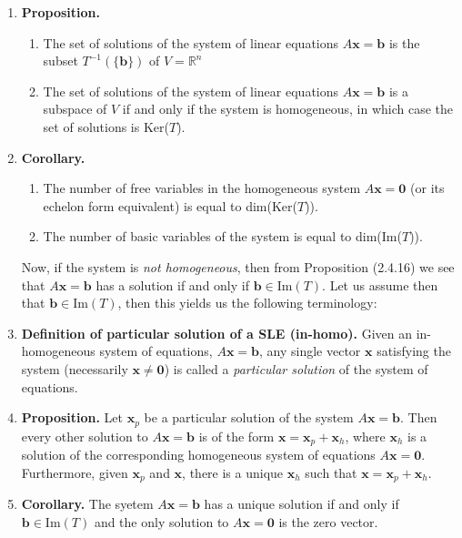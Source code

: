 \documentclass[oneside, 12pt]{book}
\newcommand{\settag}[1]{\renewcommand{\theenumi}{#1}}
\newcommand{\R}{\mathbb{R}}
\newcommand{\tbf}[1]{\textbf{#1}}
\newcommand{\tit}[1]{\textit{#1}}
\newcommand{\para}[1]{\item \tbf{#1}}
\newcommand{\vb}{\mathbf{b}}
\newcommand{\vx}{\mathbf{x}}
\begin{document}
\begin{enumerate}
        \settag{2.4.16}
        \para{Proposition.}
        \begin{enumerate}
            \item The set of solutions of the system of linear equations $A\vx = \vb$ is the subset $T^{-1}\left(\{\vb\}\right)$ of $V = \R^n$
            \item The set of solutions of the system of linear equations $A\vx = \vb$ is a subspace of $V$ if and only if the system is homogeneous, in which case the set of solutions is Ker($T$).
        \end{enumerate}
        
        \settag{2.4.17}
        \para{Corollary.} 
        \begin{enumerate}
            \item The number of free variables in the homogeneous system $A\vx = \mathbf{0}$ (or its echelon form equivalent) is equal to dim(Ker($T$)).
            \item The number of basic variables of the system is equal to dim(Im($T$)).
        \end{enumerate}
        Now, if the system is \tit{not homogeneous}, then from Proposition (2.4.16) we see that $A\vx = \vb$ has a solution if and only if $\vb \in \text{Im}(T)$. Let us assume then that $\vb \in \text{Im}(T)$, then this yields us the following terminology:
        
        \settag{2.4.18}
        \para{Definition of particular solution of a SLE (in-homo).} Given an in-homogeneous system of equations, $A\vx = \vb$, any single vector $\vx$ satisfying the system (necessarily $\vx \neq \mathbf{0}$) is called a \tit{particular solution} of the system of equations.
        
        \settag{2.4.19}
        \para{Proposition.} Let $\vx_p$ be a particular solution of the system $A\vx = \vb$. Then every other solution to $A\vx = \vb$ is of the form $\vx = \vx_p + \vx_h$, where $\vx_h$ is a solution of the corresponding homogeneous system of equations $A\vx = \mathbf{0}$. Furthermore, given $\vx_p$ and $\vx$, there is a unique $\vx_h$ such that $\vx = \vx_p + \vx_h$.
        
        \settag{2.4.20}
        \para{Corollary.} The syetem $A\vx = \vb$ has a unique solution if and only if $\vb \in \text{Im}(T)$ and the only solution to $A\vx = \mathbf{0}$ is the zero vector.
    \end{enumerate}
    
\end{document}
